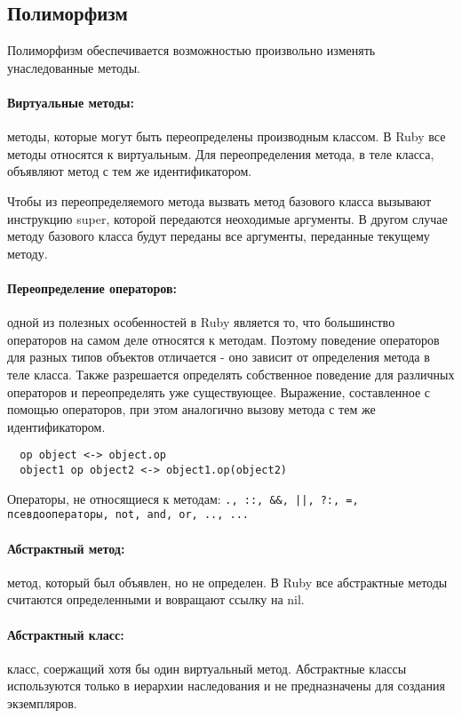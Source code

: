 \subsection{Полиморфизм}

Полиморфизм обеспечивается возможностью произвольно изменять унаследованные методы.

\paragraph*{Виртуальные методы:} методы, которые могут быть переопределены производным классом. В Ruby все методы относятся к виртуальным. Для переопределения метода, в теле класса, объявляют метод с тем же идентификатором. 

Чтобы из переопределяемого метода вызвать метод базового класса вызывают инструкцию super, которой передаются неоходимые аргументы. В другом случае методу базового класса будут переданы все аргументы, переданные текущему методу.

\paragraph*{Переопределение операторов:} одной из полезных особенностей в Ruby является то, что большинство операторов на самом деле относятся к методам. Поэтому поведение операторов для разных типов объектов отличается - оно зависит от определения метода в теле класса. Также разрешается определять собственное поведение для различных операторов и переопределять уже существующее. Выражение, составленное с помощью операторов, при этом аналогично вызову метода с тем же идентификатором.
\begin{verbatim}
  op object <-> object.op
  object1 op object2 <-> object1.op(object2)
\end{verbatim}
Операторы, не относящиеся к методам:
\verb!., ::, &&, ||, ?:, =, псевдооператоры, not, and, or, .., ... !

\paragraph*{Абстрактный метод:} метод, который был объявлен, но не определен. В Ruby все абстрактные методы считаются определенными и вовращают ссылку на nil.

\paragraph*{Абстрактный класс:} класс, соержащий хотя бы один виртуальный метод. Абстрактные классы используются только в иерархии наследования и не предназначены для создания экземпляров.


